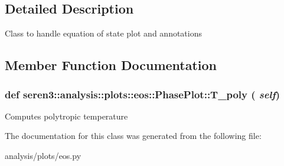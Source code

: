\subsection{Detailed Description}
\begin{DoxyVerb}
Class to handle equation of state plot and annotations
\end{DoxyVerb}
 

\subsection{Member Function Documentation}
\hypertarget{classseren3_1_1analysis_1_1plots_1_1eos_1_1PhasePlot_ab25d29e63ab8b99887c1b3bbe258614e}{
\subsubsection[{T\_\-poly}]{\setlength{\rightskip}{0pt plus 5cm}def seren3::analysis::plots::eos::PhasePlot::T\_\-poly ( {\em self})}}
\label{classseren3_1_1analysis_1_1plots_1_1eos_1_1PhasePlot_ab25d29e63ab8b99887c1b3bbe258614e}
\begin{DoxyVerb}
Computes polytropic temperature
\end{DoxyVerb}
 

The documentation for this class was generated from the following file:\begin{DoxyCompactItemize}
\item 
analysis/plots/eos.py\end{DoxyCompactItemize}
